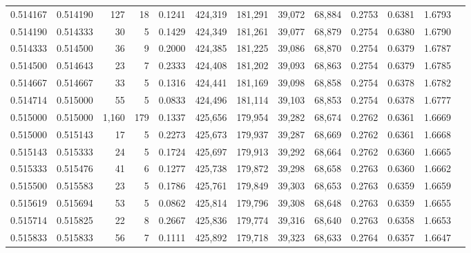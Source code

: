 \begin{tabular}{rrrrrrrrrrrrr}
0.514167 & 0.514190 &   127 &  18 &                                     0.1241 & 424,319 & 181,291 &  39,072 &  68,884 & 0.2753 & 0.6381 & 1.6793 \\
0.514190 & 0.514333 &    30 &   5 &                                     0.1429 & 424,349 & 181,261 &  39,077 &  68,879 & 0.2754 & 0.6380 & 1.6790 \\
0.514333 & 0.514500 &    36 &   9 &                                     0.2000 & 424,385 & 181,225 &  39,086 &  68,870 & 0.2754 & 0.6379 & 1.6787 \\
0.514500 & 0.514643 &    23 &   7 &                                     0.2333 & 424,408 & 181,202 &  39,093 &  68,863 & 0.2754 & 0.6379 & 1.6785 \\
0.514667 & 0.514667 &    33 &   5 &                                     0.1316 & 424,441 & 181,169 &  39,098 &  68,858 & 0.2754 & 0.6378 & 1.6782 \\
0.514714 & 0.515000 &    55 &   5 &                                     0.0833 & 424,496 & 181,114 &  39,103 &  68,853 & 0.2754 & 0.6378 & 1.6777 \\
0.515000 & 0.515000 & 1,160 & 179 &                                     0.1337 & 425,656 & 179,954 &  39,282 &  68,674 & 0.2762 & 0.6361 & 1.6669 \\
0.515000 & 0.515143 &    17 &   5 &                                     0.2273 & 425,673 & 179,937 &  39,287 &  68,669 & 0.2762 & 0.6361 & 1.6668 \\
0.515143 & 0.515333 &    24 &   5 &                                     0.1724 & 425,697 & 179,913 &  39,292 &  68,664 & 0.2762 & 0.6360 & 1.6665 \\
0.515333 & 0.515476 &    41 &   6 &                                     0.1277 & 425,738 & 179,872 &  39,298 &  68,658 & 0.2763 & 0.6360 & 1.6662 \\
0.515500 & 0.515583 &    23 &   5 &                                     0.1786 & 425,761 & 179,849 &  39,303 &  68,653 & 0.2763 & 0.6359 & 1.6659 \\
0.515619 & 0.515694 &    53 &   5 &                                     0.0862 & 425,814 & 179,796 &  39,308 &  68,648 & 0.2763 & 0.6359 & 1.6655 \\
0.515714 & 0.515825 &    22 &   8 &                                     0.2667 & 425,836 & 179,774 &  39,316 &  68,640 & 0.2763 & 0.6358 & 1.6653 \\
0.515833 & 0.515833 &    56 &   7 &                                     0.1111 & 425,892 & 179,718 &  39,323 &  68,633 & 0.2764 & 0.6357 & 1.6647 \\

\end{tabular}
